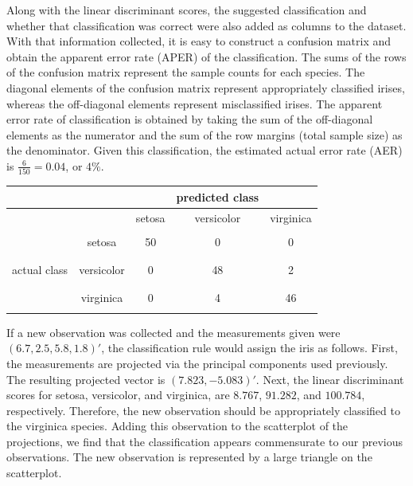 \begin{enumerate}
	Along with the linear discriminant scores, the suggested classification and whether that classification was correct were also added as columns to the dataset. With that information collected, it is easy to construct a confusion matrix and obtain the apparent error rate (APER) of the classification. The sums of the rows of the confusion matrix represent the sample counts for each species. The diagonal elements of the confusion matrix represent appropriately classified irises, whereas the off-diagonal elements represent misclassified irises. The apparent error rate of classification is obtained by taking the sum of the off-diagonal elements as the numerator and the sum of the row margins (total sample size) as the denominator. Given this classification, the estimated actual error rate (AER) is $\frac{6}{150} = 0.04$, or $4\%$.

\begin{center}
\begin{tabular}{| c | c | c c c |}
	\hline
	&& & predicted class & \\
	\hline
	&& setosa & versicolor & virginica \\
	\hline
	&&&&\\
	& setosa& 50 & 0 & 0 \\
	&&&&\\
	&&&&\\
	actual class & versicolor & 0 & 48 & 2 \\
	&&&&\\
	&&&&\\
	& virginica & 0 & 4 & 46 \\
	&&&&\\
	\hline
\end{tabular}
\end{center}

If a new observation was collected and the measurements given were $(6.7, 2.5, 5.8, 1.8)'$, the classification rule would assign the iris as follows. First, the measurements are projected via the principal components used previously. The resulting projected vector is $(7.823, -5.083)'$. Next, the linear discriminant scores for setosa, versicolor, and virginica, are $8.767$, $91.282$, and $100.784$, respectively. Therefore, the new observation should be appropriately classified to the virginica species. Adding this observation to the scatterplot of the projections, we find that the classification appears commensurate to our previous observations. The new observation is represented by a large triangle on the scatterplot.


\end{enumerate}
